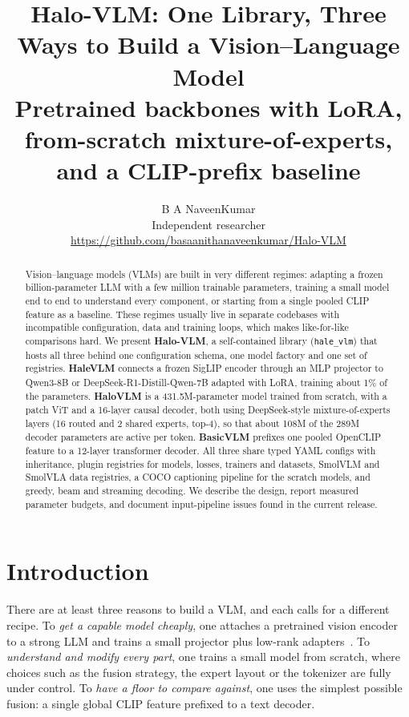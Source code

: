 \documentclass[11pt]{article}
\title{\textbf{Halo-VLM: One Library, Three Ways to Build a Vision--Language Model}\\[2pt]
\large Pretrained backbones with LoRA, from-scratch mixture-of-experts, and a CLIP-prefix baseline}
\author{B A NaveenKumar\\
\small Independent researcher\\
\small \url{https://github.com/basaanithanaveenkumar/Halo-VLM}}
\date{}
\begin{document}
\maketitle

\begin{abstract}
Vision--language models (VLMs) are built in very different regimes: adapting a frozen
billion-parameter LLM with a few million trainable parameters, training a small model end
to end to understand every component, or starting from a single pooled CLIP feature as a
baseline. These regimes usually live in separate codebases with incompatible
configuration, data and training loops, which makes like-for-like comparisons hard. We
present \textbf{Halo-VLM}, a self-contained library (\texttt{hale\_vlm}) that hosts all three
behind one configuration schema, one model factory and one set of registries.
\textbf{HaleVLM} connects a frozen SigLIP encoder through an MLP projector to Qwen3-8B or
DeepSeek-R1-Distill-Qwen-7B adapted with LoRA, training about 1\% of the parameters.
\textbf{HaloVLM} is a 431.5M-parameter model trained from scratch, with a patch ViT and a
16-layer causal decoder, both using DeepSeek-style mixture-of-experts layers (16 routed and
2 shared experts, top-4), so that about 108M of the 289M decoder parameters are active per
token. \textbf{BasicVLM} prefixes one pooled OpenCLIP feature to a 12-layer transformer
decoder. All three share typed YAML configs with inheritance, plugin registries for models,
losses, trainers and datasets, SmolVLM and SmolVLA data registries, a COCO captioning
pipeline for the scratch models, and greedy, beam and streaming decoding. We describe the
design, report measured parameter budgets, and document input-pipeline issues found in the
current release.
\end{abstract}

\section{Introduction}

There are at least three reasons to build a VLM, and each calls for a different recipe.
To \emph{get a capable model cheaply}, one attaches a pretrained vision encoder to a strong
LLM and trains a small projector plus low-rank adapters~\cite{liu2023llava,hu2022lora}. To
\emph{understand and modify every part}, one trains a small model from scratch, where
choices such as the fusion strategy, the expert layout or the tokenizer are fully under
control. To \emph{have a floor to compare against}, one uses the simplest possible fusion:
a single global CLIP feature prefixed to a text decoder.
\end{document}
